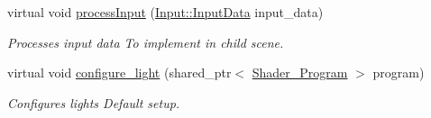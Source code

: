 \begin{DoxyCompactItemize}
virtual void \mbox{\hyperlink{classexample_1_1_scene_a798a6c155c57e9368b72014795a64d77}{process\+Input}} (\mbox{\hyperlink{classexample_1_1_input_af6bf4fd763ca01bd106ca3b03f162e3d}{Input\+::\+Input\+Data}} input\+\_\+data)
\begin{DoxyCompactList}\small\item\em Processes input data To implement in child scene. \end{DoxyCompactList}\item 
virtual void \mbox{\hyperlink{classexample_1_1_scene_ac1d8381ffdb26c061d10fc2d1b3448cc}{configure\+\_\+light}} (shared\+\_\+ptr$<$ \mbox{\hyperlink{classexample_1_1_shader___program}{Shader\+\_\+\+Program}} $>$ program)
\begin{DoxyCompactList}\small\item\em Configures lights Default setup. \end{DoxyCompactList}\end{DoxyCompactItemize}
